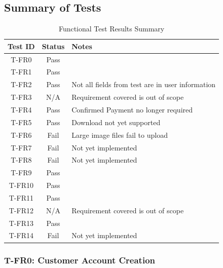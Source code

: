 \documentclass[12pt, titlepage]{article}
\begin{document}
\subsection{Summary of Tests}
\begin{table}[H]
    \centering
    \begin{tabular}{|c|c|l|}
        \hline
        \textbf{Test ID} & \textbf{Status} & \textbf{Notes}\\
        \hline
        T-FR0 & Pass & \\
        T-FR1 & Pass & \\
        T-FR2 & Pass & Not all fields from test are in user information\\
        T-FR3 & N/A & Requirement covered is out of scope\\
        T-FR4 & Pass & Confirmed Payment no longer required\\
        T-FR5 & Pass & Download not yet supported\\
        T-FR6 & Fail & Large image files fail to upload\\
        T-FR7 & Fail & Not yet implemented \\ 
        T-FR8 & Fail & Not yet implemented \\ 
        T-FR9 & Pass & \\
        T-FR10 & Pass & \\
        T-FR11 & Pass & \\
        T-FR12 & N/A & Requirement covered is out of scope\\
        T-FR13 & Pass & \\
        T-FR14 & Fail & Not yet implemented \\
        \hline
    \end{tabular}
    \caption{Functional Test Results Summary}
\end{table}


\subsubsection*{T-FR0: Customer Account Creation}
\end{document}
